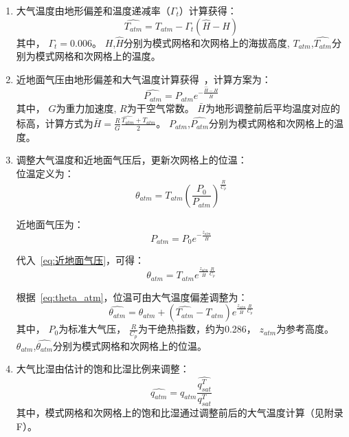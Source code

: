 \begin{enumerate}

\item  大气温度由地形偏差和温度递减率（${\Gamma}_{t}$）计算获得：\\
\begin{equation}\label{T_atm}
\hat{T_{atm}}=T_{atm}-{\Gamma}_{t} \left(\hat{H}-H\right)
\end{equation}
其中，
${\Gamma}_{t}=0.006$。
$H$,$\hat{H}$分别为模式网格和次网格上的海拔高度,
$T_{atm}$,$\hat{T_{atm}}$分别为模式网格和次网格上的温度。

\item  近地面气压由地形偏差和大气温度计算获得~\citep{Cosgrove2003}，计算方案为：\\
\begin{equation}
\hat{P_{atm}}=P_{atm} e^{-\frac{\hat{H}-H}{\bar{H}}}
\end{equation}
其中，
$G$为重力加速度, 
$R$为干空气常数。
$\bar{H}$为地形调整前后平均温度对应的标高，计算方式为$\bar{H}=\frac{R}{G} \frac{\hat{T_{atm}}+T_{atm}}{2}$。
$P_{atm}$,$\hat{P_{atm}}$分别为模式网格和次网格上的温度。

\item  调整大气温度和近地面气压后，更新次网格上的位温：\\

位温定义为：
\begin{equation}
\theta_{atm}=T_{atm} \left(\frac{P_0}{P_{atm}}\right)^\frac{R}{C_{p}}
\end{equation}

近地面气压为：
\begin{equation}\label{eq:近地面气压}
{P_{atm}}=P_{0} e^{-\frac{z_{atm}}{\bar{H}}}
\end{equation}

代入~\ref{eq:近地面气压}，可得：
\begin{equation}\label{eq:theta_atm}
\theta_{atm}=T_{atm} e^{\frac{z_{atm}}{\bar{H}} \frac{R}{C_{p}}}
\end{equation}

根据~\ref{eq:theta_atm}，位温可由大气温度偏差调整为：
\begin{equation}
\hat{\theta_{atm}}=\theta_{atm}+\left(\hat{T_{atm}}-T_{atm}\right) e^{\frac{z_{atm}}{\bar{H}} \frac{R}{C_{p}}}
\end{equation}
其中，
$P_{0}$为标准大气压，
$\frac{R}{C_{p}}$为干绝热指数，约为0.286，
$z_{atm}$为参考高度。
$\theta_{atm}$,$\hat{\theta_{atm}}$分别为模式网格和次网格上的位温。

\item 大气比湿由估计的饱和比湿比例来调整：\\
\begin{equation}
\hat{q_{atm}}=q_{atm} \frac{\hat{q_{sat}^T}}{q_{sat}^T} 
\end{equation}
其中，模式网格和次网格上的饱和比湿通过调整前后的大气温度计算（见附录F）。


\end{enumerate}
